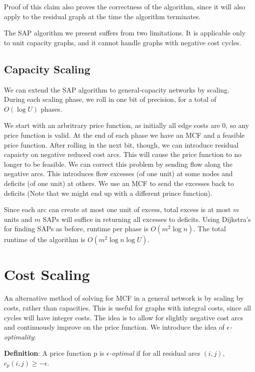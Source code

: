 \documentclass{article}
\begin{document}
Proof of this claim also proves the correctness of the algorithm, since it will also apply to the residual graph at the time the algorithm terminates.

The SAP algorithm we present suffers from two limitations.  It is applicable only to unit capacity graphs, and it cannot handle graphs with negative cost cycles.

\subsection{Capacity Scaling}

We can extend the SAP algorithm to general-capacity networks by scaling.  During each scaling phase, we roll in one bit of precision, for a total of $O(\log U)$ phases.

We start with an arbritrary price function, as initially all edge costs are $0$, so any price function is valid.  At the end of each phase we have an MCF and a feasible price function. After rolling in the next bit, though, we can introduce residual capaicty on negative reduced cost arcs.  This will cause the price function to no longer to be feasible.  We can correct this problem by sending flow along the negative arcs.  This introduces flow excesses (of one unit) at some nodes and deficits (of one unit) at others.  We use an MCF to send the excesses back to deficits (Note that we might end up with a different prince function).

Since each arc can create at most one unit of excess, total excess is at most $m$ units and $m$ SAPs will suffice in returning all excesses to deficits.  Using Dijkstra's for finding SAPs as before, runtime per phase is $O(m^2 \log n)$.  The total runtime of the algorithm is $O(m^2 \log n \log U)$.

\section{Cost Scaling}

An alternative method of solving for MCF in a general network is by scaling by costs, rather than capacities.  This is useful for graphs with integral costs, since all cycles will have integer costs.  The idea is to allow for slightly negative cost arcs and continuously improve on the price function.  We introduce the idea of
\emph{$\epsilon$-optimality}:

    \textbf{Definition}:
  A price function p is \emph{$\epsilon$-optimal}
if for all residual arcs $(i,j)$, $c_p(i,j) \geq -\epsilon$.
\end{document}
